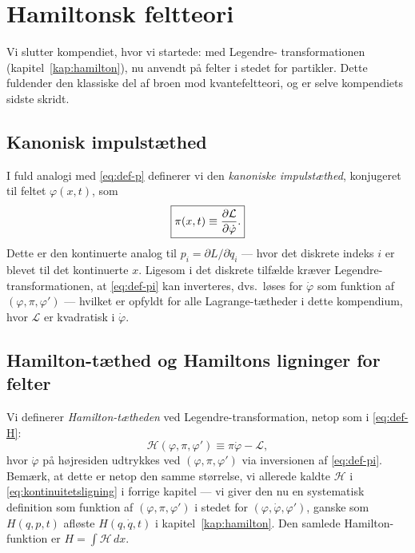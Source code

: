 
\chapter{Hamiltonsk feltteori}
\label{kap:felter-hamilton}

Vi slutter kompendiet, hvor vi startede: med Legendre-
transformationen (kapitel~\ref{kap:hamilton}), nu anvendt på felter i
stedet for partikler. Dette fuldender den klassiske del af broen mod
kvantefeltteori, og er selve kompendiets sidste skridt.

\section{Kanonisk impulstæthed}

I fuld analogi med \eqref{eq:def-p} definerer vi den \emph{kanoniske
impulstæthed}, konjugeret til feltet $\varphi(x,t)$, som
\begin{equation}
  \boxed{\pi(x,t) \equiv \pdv{\mathcal{L}}{\dot\varphi}.}
  \label{eq:def-pi}
\end{equation}
Dette er den kontinuerte analog til $p_i=\partial L/\partial\dot q_i$
— hvor det diskrete indeks $i$ er blevet til det kontinuerte $x$.
Ligesom i det diskrete tilfælde kræver Legendre-transformationen, at
\eqref{eq:def-pi} kan inverteres, dvs.\ løses for $\dot\varphi$ som
funktion af $(\varphi,\pi,\varphi')$ — hvilket er opfyldt for alle
Lagrange-tætheder i dette kompendium, hvor $\mathcal{L}$ er kvadratisk
i $\dot\varphi$.

\section{Hamilton-tæthed og Hamiltons ligninger for felter}

Vi definerer \emph{Hamilton-tætheden} ved Legendre-transformation,
netop som i \eqref{eq:def-H}:
\begin{equation}
  \boxed{\mathcal{H}(\varphi,\pi,\varphi') \equiv \pi\dot\varphi - \mathcal{L},}
  \label{eq:def-H-felt}
\end{equation}
hvor $\dot\varphi$ på højresiden udtrykkes ved $(\varphi,\pi,\varphi')$
via inversionen af \eqref{eq:def-pi}. Bemærk, at dette er netop den
samme størrelse, vi allerede kaldte $\mathcal{H}$ i
\eqref{eq:kontinuitetsligning} i forrige kapitel — vi giver den nu en
systematisk definition som funktion af $(\varphi,\pi,\varphi')$ i
stedet for $(\varphi,\dot\varphi,\varphi')$, ganske som $H(q,p,t)$
afløste $H(q,\dot q,t)$ i kapitel~\ref{kap:hamilton}. Den samlede
Hamilton-funktion er $H=\int\mathcal{H}\,dx$.

